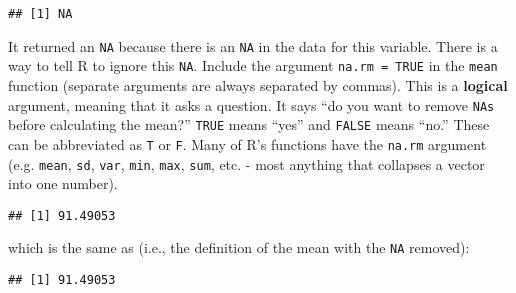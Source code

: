 \documentclass[]{book}
\newenvironment{Shaded}{\begin{snugshade}}{\end{snugshade}}
\newcommand{\KeywordTok}[1]{\textcolor[rgb]{0.13,0.29,0.53}{\textbf{#1}}}
\newcommand{\DataTypeTok}[1]{\textcolor[rgb]{0.13,0.29,0.53}{#1}}
\newcommand{\DecValTok}[1]{\textcolor[rgb]{0.00,0.00,0.81}{#1}}
\newcommand{\StringTok}[1]{\textcolor[rgb]{0.31,0.60,0.02}{#1}}
\newcommand{\OperatorTok}[1]{\textcolor[rgb]{0.81,0.36,0.00}{\textbf{#1}}}
\newcommand{\NormalTok}[1]{#1}
\theoremstyle{definition}
\theoremstyle{definition}
\theoremstyle{definition}
\theoremstyle{remark}
\begin{document}
\begin{Shaded}
\end{Shaded}

\begin{verbatim}
## [1] NA
\end{verbatim}

It returned an \texttt{NA} because there is an \texttt{NA} in the data
for this variable. There is a way to tell R to ignore this \texttt{NA}.
Include the argument \texttt{na.rm\ =\ TRUE} in the \texttt{mean}
function (separate arguments are always separated by commas). This is a
\textbf{logical} argument, meaning that it asks a question. It says ``do
you want to remove \texttt{NAs} before calculating the mean?''
\texttt{TRUE} means ``yes'' and \texttt{FALSE} means ``no.'' These can
be abbreviated as \texttt{T} or \texttt{F}. Many of R's functions have
the \texttt{na.rm} argument (e.g. \texttt{mean}, \texttt{sd},
\texttt{var}, \texttt{min}, \texttt{max}, \texttt{sum}, etc. - most
anything that collapses a vector into one number).

\begin{Shaded}
\end{Shaded}

\begin{verbatim}
## [1] 91.49053
\end{verbatim}

which is the same as (i.e., the definition of the mean with the
\texttt{NA} removed):

\begin{Shaded}
\end{Shaded}

\begin{verbatim}
## [1] 91.49053
\end{verbatim}
\end{document}
